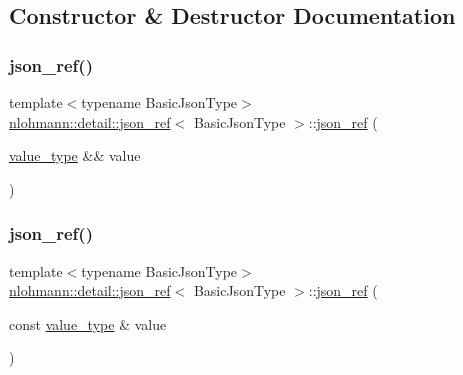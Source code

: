 \subsection{Constructor \& Destructor Documentation}
\mbox{\label{classnlohmann_1_1detail_1_1json__ref_ae1adf5bcee8b6fa0c358710604fb1938}} 
\subsubsection{\texorpdfstring{json\+\_\+ref()}{json\_ref()}\hspace{0.1cm}{\footnotesize\ttfamily [1/6]}}
{\footnotesize\ttfamily template$<$typename Basic\+Json\+Type$>$ \\
\hyperlink{classnlohmann_1_1detail_1_1json__ref}{nlohmann\+::detail\+::json\+\_\+ref}$<$ Basic\+Json\+Type $>$\+::\hyperlink{classnlohmann_1_1detail_1_1json__ref}{json\+\_\+ref} (\begin{DoxyParamCaption}\item[{\hyperlink{classnlohmann_1_1detail_1_1json__ref_a78d76cf288141049568c0d670ed670ef}{value\+\_\+type} \&\&}]{value }\end{DoxyParamCaption})\hspace{0.3cm}{\ttfamily [inline]}}

\mbox{\label{classnlohmann_1_1detail_1_1json__ref_a8c3eb3c6e952ed0cd7eece586ab4047c}} 
\subsubsection{\texorpdfstring{json\+\_\+ref()}{json\_ref()}\hspace{0.1cm}{\footnotesize\ttfamily [2/6]}}
{\footnotesize\ttfamily template$<$typename Basic\+Json\+Type$>$ \\
\hyperlink{classnlohmann_1_1detail_1_1json__ref}{nlohmann\+::detail\+::json\+\_\+ref}$<$ Basic\+Json\+Type $>$\+::\hyperlink{classnlohmann_1_1detail_1_1json__ref}{json\+\_\+ref} (\begin{DoxyParamCaption}\item[{const \hyperlink{classnlohmann_1_1detail_1_1json__ref_a78d76cf288141049568c0d670ed670ef}{value\+\_\+type} \&}]{value }\end{DoxyParamCaption})\hspace{0.3cm}{\ttfamily [inline]}}

